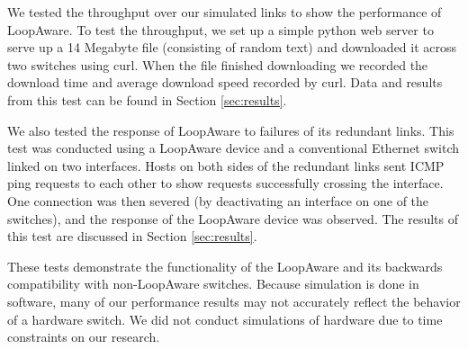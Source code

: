     We tested the throughput over our simulated links to show the performance of LoopAware.
    To test the throughput, we set up a simple python web server to serve up a 14 Megabyte file (consisting of random text) and downloaded it across two switches using curl.
    When the file finished downloading we recorded the download time and average download speed recorded by curl.
    Data and results from this test can be found in Section \ref{sec:results}.

    We also tested the response of LoopAware to failures of its redundant links.
    This test was conducted using a LoopAware device and a conventional Ethernet switch linked on two interfaces.
    Hosts on both sides of the redundant links sent ICMP ping requests to each other to show requests successfully crossing the
    interface.
    One connection was then severed (by deactivating an interface on one of the switches), and the response of the LoopAware device was observed.
    The results of this test are discussed in Section \ref{sec:results}.

    These tests demonstrate the functionality of the LoopAware and its backwards compatibility with non-LoopAware switches.
    Because simulation is done in software, many of our performance results may not accurately reflect the behavior of a hardware switch.
    We did not conduct simulations of hardware due to time constraints on our research.
